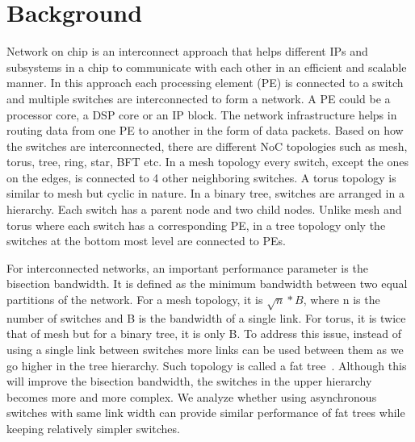 \section{Background}
\label{sec:background}
Network on chip is an interconnect approach that helps different IPs and subsystems in a chip to communicate with each other in an efficient and scalable manner. 
In this approach each processing element (PE) is connected to a switch and multiple switches are interconnected to form a network.
A PE could be a processor core, a DSP core or an IP block.
The network infrastructure helps in routing data from one PE to another in the form of data packets. 
Based on how the switches are interconnected, there are different NoC topologies such as mesh, torus, tree, ring, star, BFT etc.
In a mesh topology every switch, except the ones on the edges, is connected to 4 other neighboring switches.
A torus topology is similar to mesh but cyclic in nature.
In a binary tree, switches are arranged in a hierarchy.
Each switch has a parent node and two child nodes.
Unlike mesh and torus where each switch has a corresponding PE, in a tree topology only the switches at the bottom most level are connected to PEs.

For interconnected networks, an important performance parameter is the bisection bandwidth.
It is defined as the minimum bandwidth between two equal partitions of the network.
For a mesh topology, it is $\sqrt{n}*B$, where n is the number of switches and B is the bandwidth of a single link.
For torus, it is twice that of mesh but for a binary tree, it is only B.
To address this issue, instead of using a single link between switches more links can be used between them as we go higher in the tree hierarchy.
Such topology is called a fat tree~\cite{Leiserson1985}. 
Although this will improve the bisection bandwidth, the switches in the upper hierarchy becomes more and more complex.
We analyze whether using asynchronous switches with same link width can provide similar performance of fat trees while keeping relatively simpler switches.